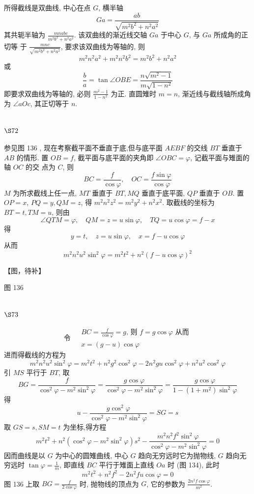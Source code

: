 所得截线是双曲线, 中心在点 $G$, 横半轴
\[
G a=\frac{a b}{\sqrt{m^{2} b^{2}+n^{2} a^{2}}}
\]
其共轭半轴为 $\frac{m n a b c}{m^{2} b^{2}+n^{2} a^{2}}$. 该双曲线的渐近线交轴 $G a$ 于中心 $G$, 与 $G a$ 所成角的正切等 于 $\frac{m n c}{\sqrt{m^{2} b^{2}+n^{2} a^{2}}}$, 要求该双曲线为等轴的, 则
\[
m^{2} n^{2} a^{2}+m^{2} n^{2} b^{2}=m^{2} b^{2}+n^{2} a^{2}
\]
或
\[
\frac{b}{a}=\tan \angle O B E=\frac{n \sqrt{m^{2}-1}}{m \sqrt{1-n^{2}}}
\]
即要求双曲线为等轴的, 必则 $\frac{m^{2}-1}{1-n^{2}}$ 为正. 直圆雉时 $m=n$, 渐近线与截线轴所成角为 $\angle a O c$, 其正切等于 $n$.

\section{$\S 72$}

参见图 136 , 现在考察截平面不垂直于底,但与底平面 $A E B F$ 的交线 $B T$ 垂直于 $A B$ 的情形. 置 $O B=f$, 截平面与底平面的夹角即 $\angle O B C=\varphi$, 记截平面与雉面的轴 $O C$ 的交 点为 $C$, 则
\[
B C=\frac{f}{\cos \varphi}, \quad O C=\frac{f \sin \varphi}{\cos \varphi}
\]
$M$ 为所求截线上任一点, $M T$ 垂直于 $B T, M Q$ 垂直于底平面, $Q P$ 垂直于 $O B$. 置 $O P=x$, $P Q=y, Q M=z$, 得 $m^{2} n^{2} z^{2}=m^{2} y^{2}+n^{2} x^{2}$. 取截线的坐标为 $B T=t, T M=u$, 则由
\[
\angle Q T M=\varphi, \quad Q M=z=u \sin \varphi, \quad T Q=u \cos \varphi=f-x
\]
得
\[
y=t, \quad z=u \sin \varphi, \quad x=f-u \cos \varphi
\]
从而 
\[
m^{2} n^{2} u^{2} \sin ^{2} \varphi=m^{2} t^{2}+n^{2}(f-u \cos \varphi)^{2}
\]

【图，待补】

图 136

\section{$\S 73$}
\[
\text { 令 } \begin{aligned}
& B C=\frac{f}{\cos \varphi}=g \text {, 则 } f=g \cos \varphi \text { 从而 } \\
& x=(g-u) \cos \varphi
\end{aligned}
\]
进而得截线的方程为
\[
m^{2} n^{2} u^{2} \sin ^{2} \varphi=m^{2} t^{2}+n^{2} g^{2} \cos ^{2} \varphi-2 n^{2} g u \cos ^{2} \varphi+n^{2} u^{2} \cos ^{2} \varphi
\]
引 $M S$ 平行于 $B T$, 取
\[
B G=\frac{f}{\cos ^{2} \varphi-m^{2} \sin ^{2} \varphi}=\frac{g \cos \varphi}{\cos ^{2} \varphi-m^{2} \sin ^{2} \varphi}=\frac{g \cos \varphi}{1-\left(1+m^{2}\right) \sin ^{2} \varphi}
\]
得
\[
u-\frac{g \cos ^{2} \varphi}{\cos ^{2} \varphi-m^{2} \sin ^{2} \varphi}=S G=s
\]
取 $G S=s, S M=t$ 为坐标,得方程
\[
m^{2} t^{2}+n^{2}\left(\cos ^{2} \varphi-m^{2} \sin ^{2} \varphi\right) s^{2}-\frac{m^{2} n^{2} f^{2} \sin ^{2} \varphi}{\cos ^{2} \varphi-m^{2} \sin ^{2} \varphi}=0
\]
因而曲线是以 $G$ 为中心的圆雉曲线, 中心 $G$ 趋向无穷远时它为抛物线, $G$ 趋向无穷远时 $\tan \varphi=\frac{1}{m}$, 即直线 $B C$ 平行于雉面上直线 $O a$ 时 (图 134), 此时
\[
m^{2} t^{2}+n^{2} f^{2}-2 n^{2} f u \cos \varphi=0
\]
图 136 上取 $B G=\frac{f}{2 \cos \varphi}$ 时, 抛物线的顶点为 $G$, 它的参数为 $\frac{2 n^{2} f \cos \varphi}{m^{2}}$.

